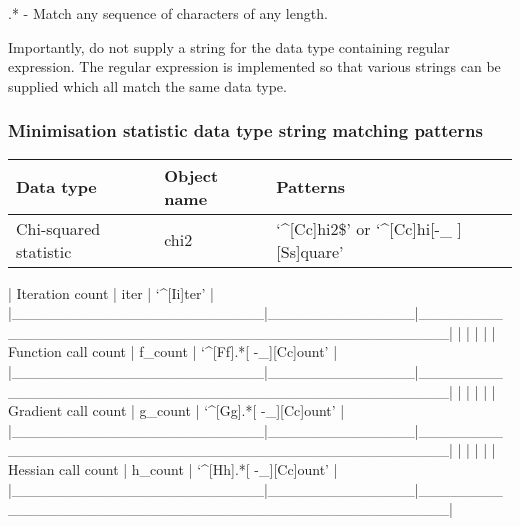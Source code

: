     .* - Match any sequence of characters of any length.

Importantly, do not supply a string for the data type containing regular expression.  The
regular expression is implemented so that various strings can be supplied which all match
the same data type.


\subsubsection{Minimisation statistic data type string matching patterns}



\begin{center}
\begin{tabular}{lll}
\toprule
Data type & Object name & Patterns \\
\midrule
 Chi-squared statistic   &  chi2          &  `\^{}[Cc]hi2\$' or `\^{}[Cc]hi[-\_ ][Ss]quare'            \\
\bottomrule
\end{tabular}
\end{center}

| Iteration count        | iter         | `\^{}[Ii]ter'                                       |
|\_\_\_\_\_\_\_\_\_\_\_\_\_\_\_\_\_\_\_\_\_\_\_\_|\_\_\_\_\_\_\_\_\_\_\_\_\_\_|\_\_\_\_\_\_\_\_\_\_\_\_\_\_\_\_\_\_\_\_\_\_\_\_\_\_\_\_\_\_\_\_\_\_\_\_\_\_\_\_\_\_\_\_\_\_\_\_\_\_|
|                        |              |                                                  |
| Function call count    | f\_count      | `\^{}[Ff].*[ -\_][Cc]ount'                           |
|\_\_\_\_\_\_\_\_\_\_\_\_\_\_\_\_\_\_\_\_\_\_\_\_|\_\_\_\_\_\_\_\_\_\_\_\_\_\_|\_\_\_\_\_\_\_\_\_\_\_\_\_\_\_\_\_\_\_\_\_\_\_\_\_\_\_\_\_\_\_\_\_\_\_\_\_\_\_\_\_\_\_\_\_\_\_\_\_\_|
|                        |              |                                                  |
| Gradient call count    | g\_count      | `\^{}[Gg].*[ -\_][Cc]ount'                           |
|\_\_\_\_\_\_\_\_\_\_\_\_\_\_\_\_\_\_\_\_\_\_\_\_|\_\_\_\_\_\_\_\_\_\_\_\_\_\_|\_\_\_\_\_\_\_\_\_\_\_\_\_\_\_\_\_\_\_\_\_\_\_\_\_\_\_\_\_\_\_\_\_\_\_\_\_\_\_\_\_\_\_\_\_\_\_\_\_\_|
|                        |              |                                                  |
| Hessian call count     | h\_count      | `\^{}[Hh].*[ -\_][Cc]ount'                           |
|\_\_\_\_\_\_\_\_\_\_\_\_\_\_\_\_\_\_\_\_\_\_\_\_|\_\_\_\_\_\_\_\_\_\_\_\_\_\_|\_\_\_\_\_\_\_\_\_\_\_\_\_\_\_\_\_\_\_\_\_\_\_\_\_\_\_\_\_\_\_\_\_\_\_\_\_\_\_\_\_\_\_\_\_\_\_\_\_\_|




